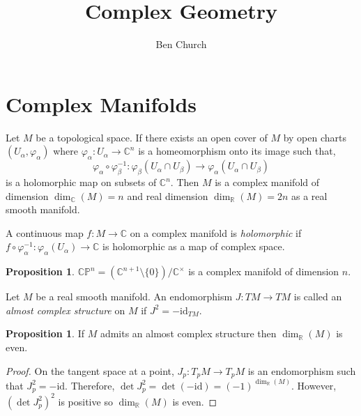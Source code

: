 \documentclass[12pt]{extarticle}
\newcommand{\R}{\mathbb{R}}
\newcommand{\C}{\mathbb{C}}
\newcommand{\id}{\mathrm{id}}
\theoremstyle{definition}
\newtheorem{proposition}[theorem]{Proposition}
\newenvironment{definition}[1][Definition:]{\begin{trivlist}
\item[\hskip \labelsep {\bfseries #1}]}{\end{trivlist}}
\newcommand{\CP}{\mathbb{CP}}
\begin{document}
\title{Complex Geometry}
\author{Ben Church}
\maketitle
\tableofcontents
\newpage

\section{Complex Manifolds}

\begin{definition}
Let $M$ be a topological space. If there exists an open cover of $M$ by open charts $(U_\alpha, \varphi_\alpha)$ where $\varphi_\alpha : U_\alpha \to \C^n$ is a homeomorphism onto its image such that,
\[ \varphi_\alpha \circ \varphi^{-1}_\beta : \varphi_\beta(U_\alpha \cap U_\beta) \to \varphi_\alpha(U_\alpha \cap U_\beta) \]
is a holomorphic map on subsets of $\C^n$. Then $M$ is a complex manifold of dimension $\dim_{\C}(M) = n$ and real dimension $\dim_{\R}(M) = 2n$ as a real smooth manifold. 
\end{definition}

\begin{definition}
A continuous map $f : M \to \C$ on a complex manifold is \textit{holomorphic} if $f \circ \varphi_{\alpha}^{-1} : \varphi_\alpha(U_\alpha) \to \C$ is holomorphic as a map of complex space. 
\end{definition}

\begin{proposition}
$\CP^{n} = (\C^{n+1} \setminus \{0\}) / \C^\times$ is a complex manifold of dimension $n$. 
\end{proposition}

\begin{definition}
Let $M$ be a real smooth manifold. An endomorphism $J : TM \to TM$ is called an \textit{almost complex structure} on $M$ if $J^2 = - \id_{TM}$. 
\end{definition}

\begin{proposition}
If $M$ admits an almost complex structure then $\dim_{\R}(M)$ is even.
\end{proposition}

\begin{proof}
On the tangent space at a point, $J_p : T_p M \to T_p M$ is an endomorphism such that $J_p^2 = - \id$. Therefore, $\det{J_p^2} = \det{(-\id)} = (-1)^{\dim_{\R}(M)}$. However, $(\det{J_p^2})^2$ is positive so $\dim_{\R}(M)$ is even.   
\end{proof}
\end{document}
